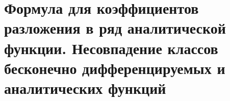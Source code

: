 \section{Формула для коэффициентов разложения в ряд аналитической функции. Несовпадение классов бесконечно дифференцируемых и аналитических функций}
